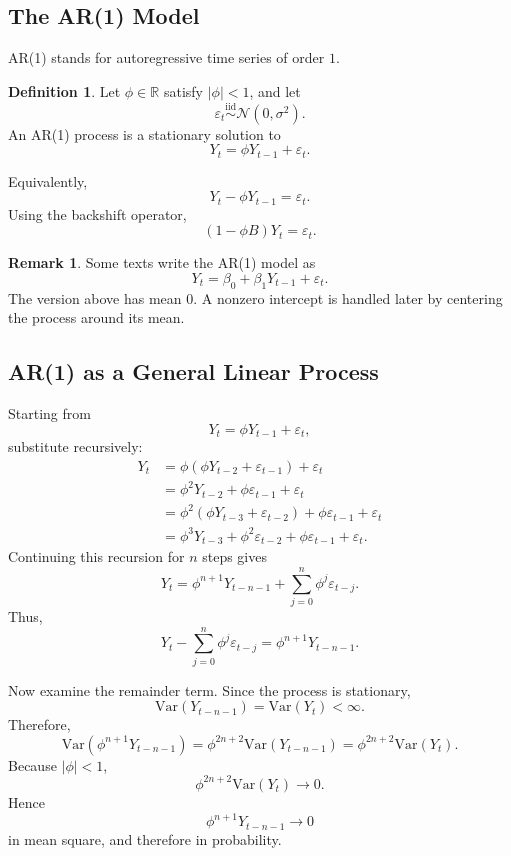 \documentclass[12pt,oneside]{book}
\numberwithin{equation}{section}
\theoremstyle{definition}
\newtheorem{definition}{Definition}[section]
\newtheorem{remark}{Remark}[section]
\theoremstyle{plain}
\theoremstyle{remark}
\newcommand{\R}{\mathbb{R}}
\newcommand{\Var}{\mathrm{Var}}
\newcommand{\iid}{\overset{\text{iid}}{\sim}}
\newcommand{\Normal}{\mathcal{N}}
\begin{document}
\subsection{The AR(1) Model}

AR(1) stands for autoregressive time series of order $1$.

\begin{definition}
Let $\phi\in\R$ satisfy $|\phi|<1$, and let
\[
\varepsilon_t \iid \Normal(0,\sigma^2).
\]
An AR(1) process is a stationary solution to
\[
Y_t=\phi Y_{t-1}+\varepsilon_t.
\]
\end{definition}

Equivalently,
\[
Y_t-\phi Y_{t-1}=\varepsilon_t.
\]
Using the backshift operator,
\[
(1-\phi B)Y_t=\varepsilon_t.
\]

\begin{remark}
Some texts write the AR(1) model as
\[
Y_t=\beta_0+\beta_1Y_{t-1}+\varepsilon_t.
\]
The version above has mean $0$. A nonzero intercept is handled later by centering the process around its mean.
\end{remark}

\subsection*{AR(1) as a General Linear Process}

Starting from
\[
Y_t=\phi Y_{t-1}+\varepsilon_t,
\]
substitute recursively:
\begin{align*}
Y_t
&=
\phi(\phi Y_{t-2}+\varepsilon_{t-1})+\varepsilon_t \\
&=
\phi^2Y_{t-2}+\phi\varepsilon_{t-1}+\varepsilon_t \\
&=
\phi^2(\phi Y_{t-3}+\varepsilon_{t-2})+\phi\varepsilon_{t-1}+\varepsilon_t \\
&=
\phi^3Y_{t-3}+\phi^2\varepsilon_{t-2}+\phi\varepsilon_{t-1}+\varepsilon_t.
\end{align*}
Continuing this recursion for $n$ steps gives
\[
Y_t
=
\phi^{n+1}Y_{t-n-1}
+
\sum_{j=0}^{n}\phi^j\varepsilon_{t-j}.
\]
Thus,
\[
Y_t-\sum_{j=0}^{n}\phi^j\varepsilon_{t-j}
=
\phi^{n+1}Y_{t-n-1}.
\]

Now examine the remainder term. Since the process is stationary,
\[
\Var(Y_{t-n-1})=\Var(Y_t)<\infty.
\]
Therefore,
\[
\Var(\phi^{n+1}Y_{t-n-1})
=
\phi^{2n+2}\Var(Y_{t-n-1})
=
\phi^{2n+2}\Var(Y_t).
\]
Because $|\phi|<1$,
\[
\phi^{2n+2}\Var(Y_t)\to 0.
\]
Hence
\[
\phi^{n+1}Y_{t-n-1}\to 0
\]
in mean square, and therefore in probability.
\end{document}
